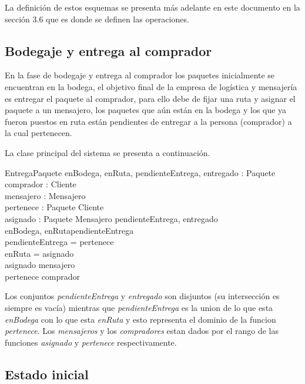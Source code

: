 \documentclass[12pt,a4paper,table]{article}
\begin{document}
La definición de estos esquemas se presenta más adelante en este documento en la sección 3.6 que es donde se definen las operaciones.

\subsection{Bodegaje y entrega al comprador}

En la fase de bodegaje y entrega al comprador los paquetes inicialmente se encuentran en la bodega, el objetivo final de la empresa de logística y mensajería es entregar el paquete al comprador, para ello debe de fijar una ruta y asignar el paquete a un mensajero, los paquetes que aún están en la bodega y los que ya fueron puestos en ruta están pendientes de entregar a la persona (comprador) a la cual pertenecen.

La clase principal del sistema se presenta a continuación.

\begin{schema}{EntregaPaquete}
enBodega, enRuta, pendienteEntrega, entregado : \power Paquete\\
comprador : \power Cliente\\ 
mensajero : \power Mensajero\\
pertenece : Paquete \pfun Cliente\\
asignado : Paquete \pfun Mensajero
\where
\disjoint \langle pendienteEntrega, entregado \rangle\\
\langle enBodega, enRuta\rangle \partition pendienteEntrega \\
pendienteEntrega = \dom pertenece \\
enRuta = \dom asignado \\
\ran asignado \subseteq mensajero \\
\ran pertenece \subseteq comprador
\end{schema}

Los conjuntos \textit{pendienteEntrega} y \textit{entregado} son disjuntos (su intersección es siempre es vacía) mientras que \textit{pendienteEntrega} es la union de lo que esta \textit{enBodega} con lo que esta \textit{enRuta} y esto representa el dominio de la funcion \textit{pertenece}. Los \textit{mensajeros} y los \textit{compradores} estan dados por el rango de las funciones \textit{asignado} y \textit{pertenece} respectivamente.

\subsection{Estado inicial}
\end{document}
